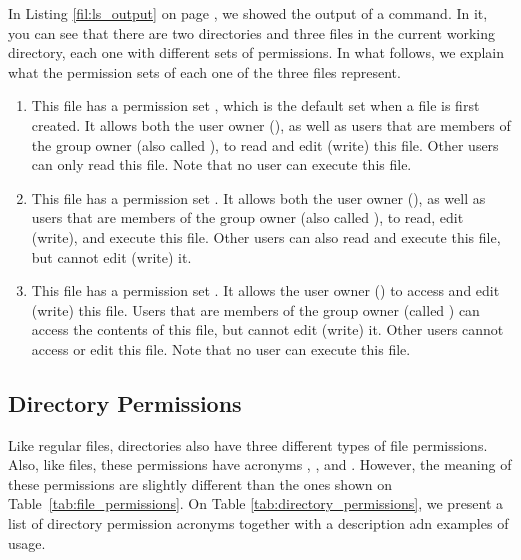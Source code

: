 In Listing \ref{fil:ls_output} on page \pageref{fil:ls_output}, we showed  the output of a  command. In it, you can see that there are two directories and three files in the current working directory, each one with different sets of permissions. In what follows, we explain what the permission sets of each one of the three files represent.


\begin{enumerate}
\item[\mycommand{read\_me}] This file has a permission set , which is the default set when a file is first created. It allows both the user owner (), as well as users that are members of the group owner (also called ), to read and edit (write) this file. Other users can only read this file. Note that no user can execute this file.
\item[\mycommand{script.sh}] This file has a permission set . It allows both the user owner (), as well as users that are members of the group owner (also called ), to read, edit (write), and execute this file. Other users can also read and execute this file, but cannot edit (write) it.
\item[\mycommand{config.pdf}] This file has a permission set . It allows the user owner () to access and edit (write) this file. Users that are members of the group owner (called ) can access the contents of this file, but cannot edit (write) it. Other users cannot access or edit this file. Note that no user can execute this file.
\end{enumerate}


\subsection{Directory Permissions}

Like regular files, directories also have three different types of file permissions. Also, like files, these permissions have acronyms , , and . However, the meaning of these permissions are slightly different than the ones shown on Table~\ref{tab:file_permissions}. On Table \ref{tab:directory_permissions}, we present a list of directory permission acronyms together with a description adn examples of usage. 

